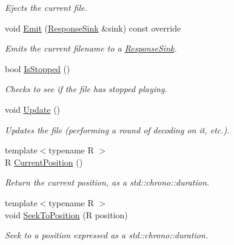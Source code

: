 \begin{DoxyCompactItemize}
\begin{DoxyCompactList}\small\item\em Ejects the current file. \end{DoxyCompactList}\item 
void \hyperlink{classPlayerFile_a00f044c74d07d778532953a917c24197}{Emit} (\hyperlink{classResponseSink}{Response\+Sink} \&sink) const override
\begin{DoxyCompactList}\small\item\em Emits the current filename to a \hyperlink{classResponseSink}{Response\+Sink}. \end{DoxyCompactList}\item 
bool \hyperlink{classPlayerFile_a43d903e65213d3a6b2c8b38924c83c5f}{Is\+Stopped} ()
\begin{DoxyCompactList}\small\item\em Checks to see if the file has stopped playing. \end{DoxyCompactList}\item 
\hypertarget{classPlayerFile_afe0b43a6980e548a6faa87f84d22d65b}{void \hyperlink{classPlayerFile_afe0b43a6980e548a6faa87f84d22d65b}{Update} ()}\label{classPlayerFile_afe0b43a6980e548a6faa87f84d22d65b}

\begin{DoxyCompactList}\small\item\em Updates the file (performing a round of decoding on it, etc.). \end{DoxyCompactList}\item 
{\footnotesize template$<$typename R $>$ }\\R \hyperlink{classPlayerFile_a072d9788c1449e0e2de3e28b169f2c34}{Current\+Position} ()
\begin{DoxyCompactList}\small\item\em Return the current position, as a std\+::chrono\+::duration. \end{DoxyCompactList}\item 
{\footnotesize template$<$typename R $>$ }\\void \hyperlink{classPlayerFile_a8c270134404d83fe6c9e844abeacf3e5}{Seek\+To\+Position} (R position)
\begin{DoxyCompactList}\small\item\em Seek to a position expressed as a std\+::chrono\+::duration. \end{DoxyCompactList}\end{DoxyCompactItemize}
